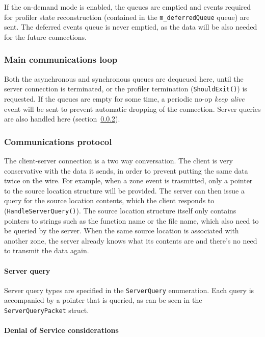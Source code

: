 \documentclass[hidelinks,titlepage,a4paper]{article}
\begin{document}
If the on-demand mode is enabled, the queues are emptied and events required for profiler state reconstruction (contained in the \texttt{m\_deferredQueue} queue) are sent. The deferred events queue is never emptied, as the data will be also needed for the future connections.

\subsubsection{Main communications loop}

Both the asynchronous and synchronous queues are dequeued here, until the server connection is terminated, or the profiler termination (\texttt{ShouldExit()}) is requested. If the queues are empty for some time, a periodic no-op \emph{keep alive} event will be sent to prevent automatic dropping of the connection. Server queries are also handled here (section~\ref{communicationsprotocol}).

\subsubsection{Communications protocol}
\label{communicationsprotocol}

The client-server connection is a two way conversation. The client is very conservative with the data it sends, in order to prevent putting the same data twice on the wire. For example, when a zone event is trasmitted, only a pointer to the source location structure will be provided. The server can then issue a query for the source location contents, which the client responds to (\texttt{HandleServerQuery()}). The source location structure itself only contains pointers to strings such as the function name or the file name, which also need to be queried by the server. When the same source location is associated with another zone, the server already knows what its contents are and there's no need to transmit the data again.

\paragraph{Server query}

Server query types are specified in the \texttt{ServerQuery} enumeration. Each query is accompanied by a pointer that is queried, as can be seen in the \texttt{ServerQueryPacket} struct.

\paragraph{Denial of Service considerations}
\end{document}
